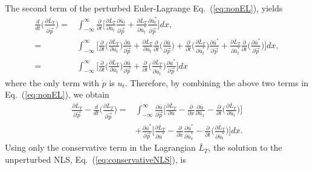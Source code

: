 The second term of the perturbed Euler-Lagrange Eq.~(\ref{eq:nonEL}), yields 
\begin{align}
\frac{d}{dt} \Bigg( \frac{\partial \bar{L}_T}{\partial \dot{\vec{p}}} \Bigg) =& \int_{-\infty}^{\infty} \frac{\partial}{\partial t} \Bigg[ \frac{\partial \bar{L}_T}{\partial \bar{u}_t} \frac{\partial \bar{u}_t}{\partial \dot{\vec{p}}} + \frac{\partial \bar{L}_T}{\partial \bar{u}_t^*} \frac{\partial \bar{u}_t^*}{\partial \dot{\vec{p}}} \Bigg] dx, \nonumber \\
=& \int_{-\infty}^{\infty} \Bigg[ \frac{\partial }{\partial t} \Big( \frac{\partial \bar{L}_T}{\partial \bar{u}_t} \Big) \frac{\partial \bar{u}}{\partial \vec{p}} + \frac{\partial \bar{L}_T}{\partial \bar{u}_t}\frac{\partial }{\partial t} \Big( \frac{\partial \bar{u}}{\partial \vec{p}} \Big) 
+  \frac{\partial }{\partial t} \Big( \frac{\partial \bar{L}_T}{\partial \bar{u}_t^*} \Big) \frac{\partial \bar{u}^*}{\partial \vec{p}} + \frac{\partial \bar{L}_T}{\partial \bar{u}_t^*}\frac{\partial }{\partial t} \Big( \frac{\partial \bar{u}^*}{\partial \vec{p}} \Big) \Bigg]dx, \nonumber \\
=& \int_{-\infty}^{\infty} \Bigg[ \frac{\partial }{\partial t} \Big( \frac{\partial \bar{L}_T}{\partial \bar{u}_t} \Big) \frac{\partial \bar{u}}{\partial \vec{p}} +  \frac{\partial }{\partial t} \Big( \frac{\partial \bar{L}_T}{\partial \bar{u}_t^*} \Big) \frac{\partial \bar{u}^*}{\partial \vec{p}}  \Bigg]dx \nonumber 
\end{align}
where the only term with $\dot{p}$ is $u_t$.
Therefore, by combining the above two terms in Eq.~(\ref{eq:nonEL}), we obtain
\begin{align}
 \frac{\partial \bar{L}_T}{\partial \vec{p}} - \frac{d}{dt} \Bigg( \frac{\partial \bar{L}_T}{\partial \dot{\vec{p}}} \Bigg)  =& \int_{-\infty}^{\infty} \frac{\partial \bar{u}}{\partial \vec{p}} \Bigg[ \frac{\partial \bar{L}_T}{\partial \bar{u}} - \frac{\partial }{\partial x}\frac{\partial \bar{u}}{\partial \bar{u}_x} - \frac{\partial}{\partial t} \Big( \frac{\partial \bar{L}_T}{\partial \bar{u}_t} \Big) \Bigg]  \nonumber \\
 &+ \frac{\partial \bar{u}^*}{\partial \vec{p}} \Bigg[\frac{\partial \bar{L}_T}{\partial \bar{u}^*} - \frac{\partial }{\partial x}\frac{\partial \bar{u}^*}{\partial \bar{u}_x^*} - \frac{\partial}{\partial t} \Big( \frac{\partial \bar{L}_T}{\partial \bar{u}_t^*} \Big) \Bigg] dx. \nonumber
\end{align}
Using only the conservative term in the Lagrangian $\bar{L}_T$, the solution to the unperturbed NLS, Eq.~(\ref{eq:conservativeNLS}), is 
